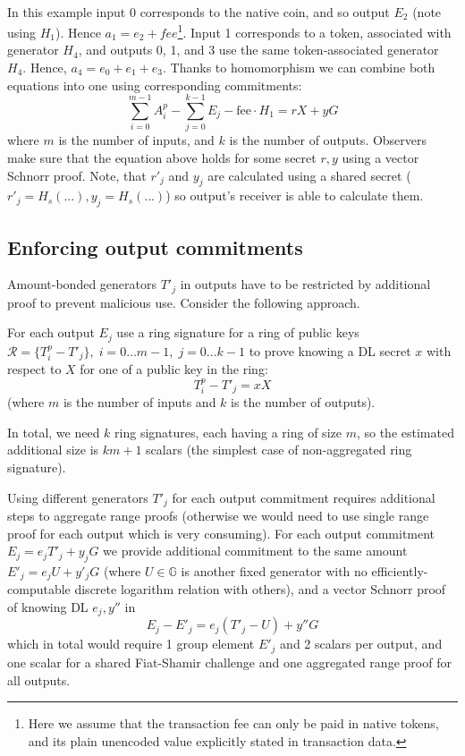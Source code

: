 \documentclass{article}
\begin{document}
\\
In this example input 0 corresponds to the native coin, and so output $E_2$ (note using $H_1$). Hence $a_1 = e_2 + \textit{fee}$\footnote{Here we assume that the transaction fee can only be paid in native tokens, and its plain unencoded value explicitly stated in transaction data.}. Input 1 corresponds to a token, associated with generator $H_4$, and outputs 0, 1, and 3 use the same token-associated generator $H_4$. Hence, $a_4 = e_0 + e_1 + e_3$. Thanks to homomorphism we can combine both equations into one using corresponding commitments:
\begin{equation}\label{eq_A_main_sum}
    \sum_{i=0}^{m-1}{A^p_i} - \sum_{j=0}^{k-1}{E_j} - \text{fee}\cdot H_1 = rX + yG
\end{equation}
where $m$ is the number of inputs, and $k$ is the number of outputs. Observers make sure that the equation above holds for some secret $r, y$ using a vector Schnorr proof.
Note, that $r'_j$ and $y_j$ are calculated using a shared secret ($r'_j = H_s(...), y_j = H_s(...)$) so output's receiver is able to calculate them.


\subsection{Enforcing output commitments}
Amount-bonded generators $T'_j$ in outputs have to be restricted by additional proof to prevent malicious use. Consider the following approach.

For each output $E_j$ use a ring signature for a ring of public keys $\mathcal{R} = \{T^p_i - T'_j\},\; i = 0 \dots m-1, \; j = 0\dots k-1$ to prove knowing a DL secret $x$ with respect to $X$ for one of a public key in the ring:
\[ T^p_i - T'_j = xX \] (where $m$ is the number of inputs and $k$ is the number of outputs).

In total, we need $k$ ring signatures, each having a ring of size $m$, so the estimated additional size is $km + 1$ scalars (the simplest case of non-aggregated ring signature).

Using different generators $T'_j$ for each output commitment requires additional steps to aggregate range proofs (otherwise we would need to use single range proof for each output which is very consuming). For each output commitment $E_j = e_j T'_j + y_j G$ we provide additional commitment to the same amount $E'_j = e_jU + y'_jG$ (where $U \in \mathbb{G}$ is another fixed generator with no efficiently-computable discrete logarithm relation with others), and a vector Schnorr proof of knowing DL $e_j, y''$ in
\[ E_j - E'_j = e_j (T'_j - U) + y'' G\] which in total would require 1 group element $E'_j$ and 2 scalars per output, and one scalar for a shared Fiat-Shamir challenge and one aggregated range proof for all outputs.
\end{document}
